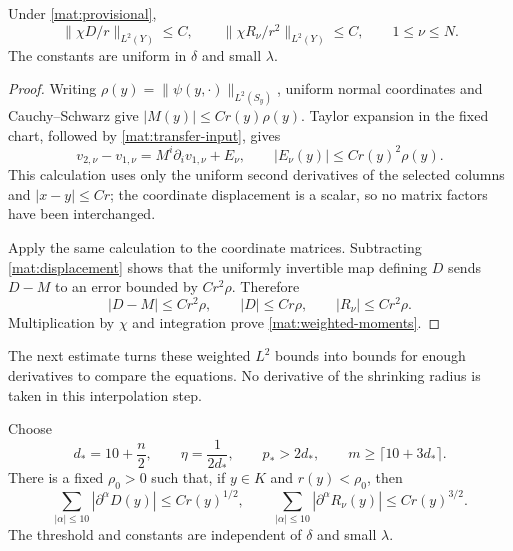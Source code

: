 \begin{lemma}
\label{mat:moments}
Under \eqref{mat:provisional},
\begin{equation}
 \|\chi D/r\|_{L^2(Y)}\le C,
 \qquad
 \|\chi R_\nu/r^2\|_{L^2(Y)}\le C,
                   \qquad 1\le\nu\le N.
 \label{mat:weighted-moments}
\end{equation}
The constants are uniform in $\delta$ and small $\lambda$.
\end{lemma}

\begin{proof}
Writing $\rho(y)=\|\psi(y,\cdot)\|_{L^2(S_y)}$, uniform normal
coordinates and Cauchy--Schwarz give $|M(y)|\le Cr(y)\rho(y)$.
Taylor expansion in the fixed chart, followed by
\eqref{mat:transfer-input}, gives
\begin{equation}
 v_{2,\nu}-v_{1,\nu}
      =M^i\partial_i v_{1,\nu}+E_\nu,
             \qquad |E_\nu(y)|\le Cr(y)^2\rho(y).
 \label{mat:taylor-transfer}
\end{equation}
This calculation uses only the uniform second derivatives of the
selected columns and $|x-y|\le Cr$; the coordinate displacement is a
scalar, so no matrix factors have been interchanged.

Apply the same calculation to the coordinate matrices.  Subtracting
\eqref{mat:displacement} shows that the uniformly invertible map
defining $D$ sends $D-M$ to an error bounded by $Cr^2\rho$.  Therefore
\[
 |D-M|\le Cr^2\rho,
 \qquad |D|\le Cr\rho,
 \qquad |R_\nu|\le Cr^2\rho.
\]
Multiplication by $\chi$ and integration prove
\eqref{mat:weighted-moments}.
\end{proof}

The next estimate turns these weighted $L^2$ bounds into bounds for
enough derivatives to compare the equations.  No derivative of the
shrinking radius is taken in this interpolation step.

\begin{lemma}
\label{mat:interpolation}
Choose
\[
 d_*=10+\frac n2,\qquad \eta=\frac1{2d_*},\qquad
 p_*>2d_*,\qquad m\ge\lceil10+3d_*\rceil.
\]
There is a fixed $\rho_0>0$ such that, if
$y\in K$ and $r(y)<\rho_0$, then
\begin{equation}
 \sum_{|\alpha|\le10}|\partial^\alpha D(y)|\le Cr(y)^{1/2},
 \qquad
 \sum_{|\alpha|\le10}|\partial^\alpha R_\nu(y)|
                                      \le Cr(y)^{3/2}.
 \label{mat:pointwise}
\end{equation}
The threshold and constants are independent of $\delta$ and small
$\lambda$.
\end{lemma}

